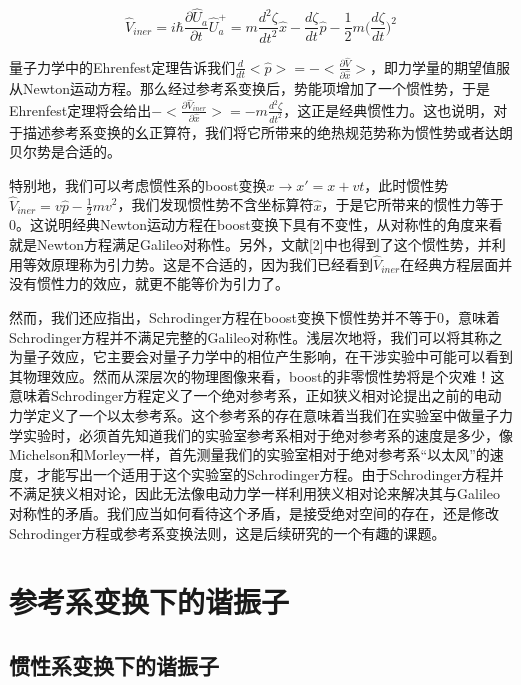 \documentclass[a4paper]{article}
\begin{document}
        \begin{equation}
            \hat{V}_{iner} = i\hbar\frac{\partial\hat{U}_a}{\partial t}\hat{U}_a^+ = m \frac{d^2\zeta}{d t^2}\hat{x}-\frac{d\zeta}{dt}\hat{p}-\frac{1}{2}m\bigg(\frac{d\zeta}{dt}\bigg)^2
        \end{equation}

        量子力学中的Ehrenfest定理告诉我们$\frac{d}{dt}<\hat{p}>=-<\frac{\partial\hat{V}}{\partial \hat{x}}>$，即力学量的期望值服从Newton运动方程。那么经过参考系变换后，势能项增加了一个惯性势，于是Ehrenfest定理将会给出$-<\frac{\partial\hat{V}_{iner}}{\partial \hat{x}}>=-m \frac{d^2\zeta}{d t^2}$，这正是经典惯性力。这也说明，对于描述参考系变换的幺正算符，我们将它所带来的绝热规范势称为惯性势或者达朗贝尔势是合适的。

        特别地，我们可以考虑惯性系的boost变换$x\rightarrow x'=x+vt$，此时惯性势$\hat{V}_{iner}=v\hat{p}-\frac{1}{2}mv^2$，我们发现惯性势不含坐标算符$\hat{x}$，于是它所带来的惯性力等于0。这说明经典Newton运动方程在boost变换下具有不变性，从对称性的角度来看就是Newton方程满足Galileo对称性。另外，文献[2]中也得到了这个惯性势，并利用等效原理称为引力势。这是不合适的，因为我们已经看到$\hat{V}_{iner}$在经典方程层面并没有惯性力的效应，就更不能等价为引力了。
        
        然而，我们还应指出，Schrodinger方程在boost变换下惯性势并不等于0，意味着Schrodinger方程并不满足完整的Galileo对称性。浅层次地将，我们可以将其称之为量子效应，它主要会对量子力学中的相位产生影响，在干涉实验中可能可以看到其物理效应。然而从深层次的物理图像来看，boost的非零惯性势将是个灾难！这意味着Schrodinger方程定义了一个绝对参考系，正如狭义相对论提出之前的电动力学定义了一个以太参考系。这个参考系的存在意味着当我们在实验室中做量子力学实验时，必须首先知道我们的实验室参考系相对于绝对参考系的速度是多少，像Michelson和Morley一样，首先测量我们的实验室相对于绝对参考系“以太风”的速度，才能写出一个适用于这个实验室的Schrodinger方程。由于Schrodinger方程并不满足狭义相对论，因此无法像电动力学一样利用狭义相对论来解决其与Galileo对称性的矛盾。我们应当如何看待这个矛盾，是接受绝对空间的存在，还是修改Schrodinger方程或参考系变换法则，这是后续研究的一个有趣的课题。


    \section{参考系变换下的谐振子}

    \subsection{惯性系变换下的谐振子}
\end{document}
